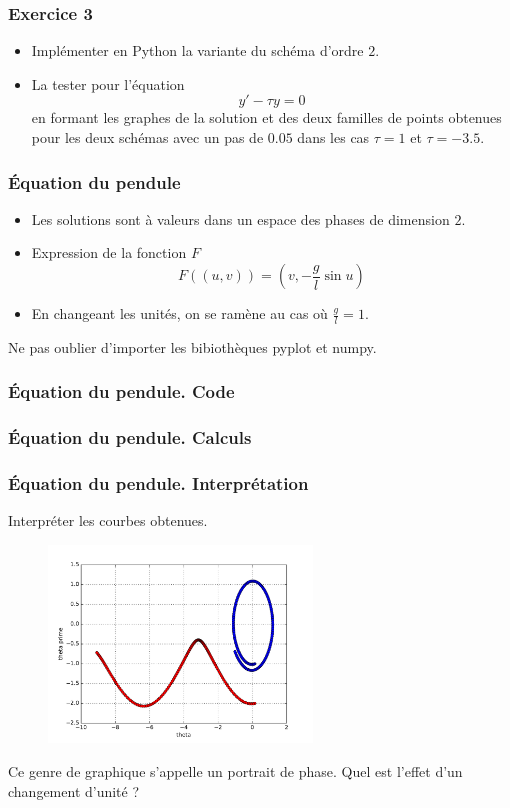 \begin{frame}
  \frametitle{Exercice 3}
\begin{itemize}
  \item Implémenter en Python la variante du schéma d'ordre $2$.
  \item La tester pour l'équation
\begin{equation*}
  y' - \tau y =0
\end{equation*}
en formant les graphes de la solution et des deux familles de points obtenues pour les deux schémas avec un pas de $0.05$ dans les cas $\tau=1$ et $\tau=-3.5$.
\end{itemize}
\end{frame}

\begin{frame}
  \frametitle{\'Equation du pendule}
\begin{itemize}
  \item Les solutions sont à valeurs dans un espace des phases de dimension $2$.
  \item Expression de la fonction $F$
\begin{displaymath}
  F((u,v)) = (v,-\frac{g}{l}\sin u)
\end{displaymath}
  \item En changeant les unités, on se ramène au cas où $\frac{g}{l}=1$. 
\end{itemize}
Ne pas oublier d'importer les bibiothèques pyplot et numpy.
\end{frame}

\begin{frame}
  \frametitle{\'Equation du pendule. Code}

\end{frame}

\begin{frame}
  \frametitle{\'Equation du pendule. Calculs}

\end{frame}

\begin{frame}
  \frametitle{\'Equation du pendule. Interprétation}
Interpréter les courbes obtenues.
\begin{figure}[H]
  \centering
  \includegraphics[width=7cm]{./resolnumeqdiff_1.pdf}
\end{figure}
Ce genre de graphique s'appelle un portrait de phase.\newline
Quel est l'effet d'un changement d'unité ?
\end{frame}


